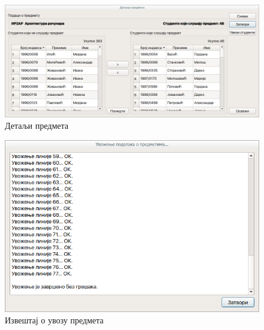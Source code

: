 \documentclass[a4paper, 12pt, diplomski]{etfcyr}
\begin{document}
\begin{justify}
					\begin{figure}[H]
						\begin{center}
							\includegraphics[width=1.0\textwidth]{manual/courses_details_dialog.png}
						\end{center}
						\caption{Детаљи предмета}
						\label{figure:courses_details_dialog}
					\end{figure}
					\begin{figure}[H]
						\begin{center}
							\includegraphics[width=1.0\textwidth]{manual/courses_import_dialog.png}
						\end{center}
						\caption{Извештај о увозу предмета}
						\label{figure:courses_import_dialog}
					\end{figure}
				\end{justify}
\end{document}
